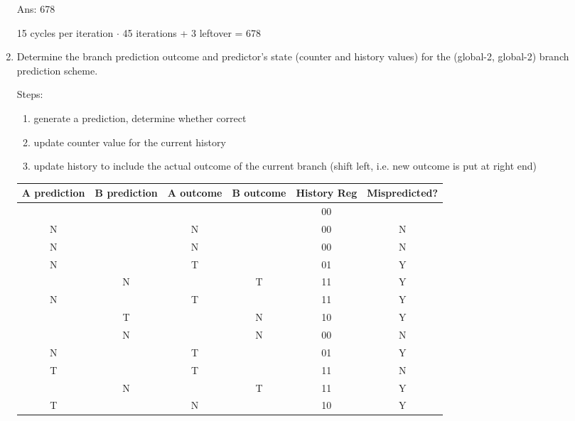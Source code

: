 \documentclass[12pt]{article}
\begin{document}
\begin{enumerate}
        Ans: 678

        15 cycles per iteration $\cdot$ 45 iterations + 3 leftover = 678

        \item Determine the branch prediction outcome and predictor's state (counter and history values) for the 
        (global-2, global-2) branch prediction scheme.

        Steps:

        \begin{enumerate}
            \item generate a prediction, determine whether correct
            \item update counter value for the current history
            \item update history to include the actual outcome of the current branch (shift left, i.e. new outcome is put at right end)
        \end{enumerate}

        \begin{tabular}[ht!]{|c|c|c|c|c|c|}\hline
            A prediction & B prediction & A outcome & B outcome & History Reg & Mispredicted? \\\hline
                         &              &           &           & 00          &               \\\hline
            N            &              & N         &           & 00          & N             \\\hline
            N            &              & N         &           & 00          & N             \\\hline
            N            &              & T         &           & 01          & Y             \\\hline
                         & N            &           & T         & 11          & Y             \\\hline
            N            &              & T         &           & 11          & Y             \\\hline
                         & T            &           & N         & 10          & Y             \\\hline
                         & N            &           & N         & 00          & N             \\\hline
            N            &              & T         &           & 01          & Y             \\\hline
            T            &              & T         &           & 11          & N             \\\hline
                         & N            &           & T         & 11          & Y             \\\hline
            T            &              & N         &           & 10          & Y             \\\hline
        \end{tabular}


\end{enumerate}
\end{document}
